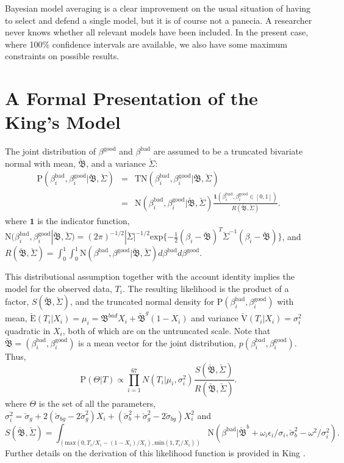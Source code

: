 \documentclass[11pt,titlepage]{article}
\newcommand{\bbeta}{{\mathfrak B}}
\newcommand{\bbetau}{\breve{\mathfrak B}}
\newcommand{\sigmau}{\breve{\sigma}}
\newcommand{\Sigmau}{\breve{\Sigma}}
\newcommand{\Eu}{\breve{\text{E}}}
\newcommand{\Vu}{\breve{\text{V}}}
\newcommand{\TN}{\text{TN}}
\newcommand{\N}{\text{N}}
\renewcommand{\P}{\text{P}}
\newcommand{\bb}{\beta^{\text{bad}}}
\newcommand{\bg}{\beta^{\text{good}}}
\begin{document}
Bayesian model averaging is a clear improvement on the usual situation
of having to select and defend a single model, but it is of course not
a panecia. A researcher never knows whether all relevant models have
been included.  In the present case, where 100\% confidence intervals
are available, we also have some maximum constraints on possible results.

\appendix
\section{A Formal Presentation of the King's Model} \label{appx:king}

The joint distribution of $\bg$ and $\bb$ are assumed to be a
truncated bivariate normal with mean, $\bbetau$, and a variance
$\Sigmau$:
\begin{eqnarray}
\P(\bb_i, \bg_i | \bbetau, \Sigmau) & = & 
\TN (\bb_i,\bg_i | \bbetau, \Sigmau) \\
& = & \N (\bb_i, \bg_i | \bbetau, \Sigmau)
\frac{\mathbf{1}(\bb_i, \bg_i \in [0,1])}
{R(\bbetau, \Sigmau)}.
\end{eqnarray}
where $\mathbf{1}$ is the indicator function, $\N (\bb_i,
\bg_i | \bbetau, \Sigmau) = (2 \pi)^{-1/2} |\Sigmau|^{-1/2}
\text{exp} \{ - \frac{1}{2} (\beta_i-\bbetau)^T \Sigmau^{-1} (\beta_i
- \bbetau) \}$, and $R (\bbetau, \Sigmau) = \int_0^1 \int_0^1 \N
(\bb, \bg | \bbetau, \Sigmau) d\bb
d\bg$.

This distributional assumption together with the account identity
implies the model for the observed data, $T_i$. The resulting
likelihood is the product of a factor, $S(\bbetau, \Sigmau)$, and the
truncated normal density for $\P(\bb_i, \bg_i)$ with
mean, $\Eu(T_i|X_i) = \mu_i = \bbeta^{bad} X_i + \bbetau^g (1-X_i)$
and variance $\Vu(T_i|X_i) = \sigma^2_i$ quadratic in $X_i$, both of
which are on the untruncated scale. Note that $\bbetau=(\bb_i,
\bg_i)$ is a mean vector for the joint distribution,
$p(\bb_i, \bg_i)$. Thus,
\begin{equation}
\P(\Theta|T) \propto \prod_{i=1}^{67} N(T_i|\mu_i, \sigma_i^2)
\frac{S(\bbetau, \Sigmau)}{R(\bbetau, \Sigmau)}. \label{eq:likelihood}
\end{equation} 
where $\Theta$ is the set of all the parameters, $\sigma_i^2=\sigmau_g
+ 2(\sigmau_{bg} - 2 \sigmau_g^2) X_i + (\sigmau_b^2 + \sigmau_g^2 -
2\sigmau_{bg}) X_i^2$ and 
$$S(\bbetau, \Sigmau)=\int_{(\text{max}(0, T_i/X_i-(1-X_i)/X_i),
  \text{min}(1,T_i/X_i))} \N(\bb|\bbetau^b + \omega_i
\epsilon_i / \sigma_i, \sigmau^2_b-\omega^2/\sigma^2_i).$$
Further
details on the derivation of this likelihood function is provided in
King \citeyear[Ch.\ 7]{king:97}.
\end{document}
